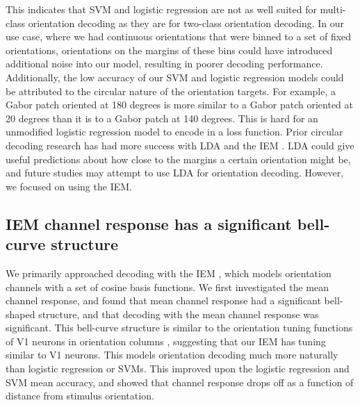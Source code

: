 \documentclass[../main.tex]{subfiles}
\begin{document}
This indicates that SVM and logistic regression are not as well suited for multi-class orientation decoding as they are for two-class orientation decoding. In our use case, where we had continuous orientations that were binned to a set of fixed orientations, orientations on the margins of these bins could have introduced additional noise into our model, resulting in poorer decoding performance. Additionally, the low accuracy of our SVM and logistic regression models could be attributed to the circular nature of the orientation targets. For example, a Gabor patch oriented at 180 degrees is more similar to a Gabor patch oriented at 20 degrees than it is to a Gabor patch at 140 degrees. This is hard for an unmodified logistic regression model to encode in a loss function. Prior circular decoding research has had more success with LDA \citep{kamitani_tong_2005} and the IEM \citep{Brouwer09, Brouwer, GARCIA2013515, sprague_serences_2013, sprague_saproo_serences_2015}. LDA could give useful predictions about how close to the margins a certain orientation might be, and future studies may attempt to use LDA for orientation decoding. However, we focused on using the IEM.

\subsection*{IEM channel response has a significant bell-curve structure}
We primarily approached decoding with the IEM \citep{Brouwer09, Brouwer, sprague_serences_2013, GARCIA2013515, sprague_saproo_serences_2015}, which models orientation channels with a set of cosine basis functions. We first investigated the mean channel response, and found that mean channel response had a significant bell-shaped structure, and that decoding with the mean channel response was significant. This bell-curve structure is similar to the orientation tuning functions of V1 neurons in orientation columns \citep{devalois_1978}, suggesting that our IEM has tuning similar to V1 neurons. This models orientation decoding much more naturally than logistic regression or SVMs. This improved upon the logistic regression and SVM mean accuracy, and showed that channel response drops off as a function of distance from stimulus orientation.
\end{document}
